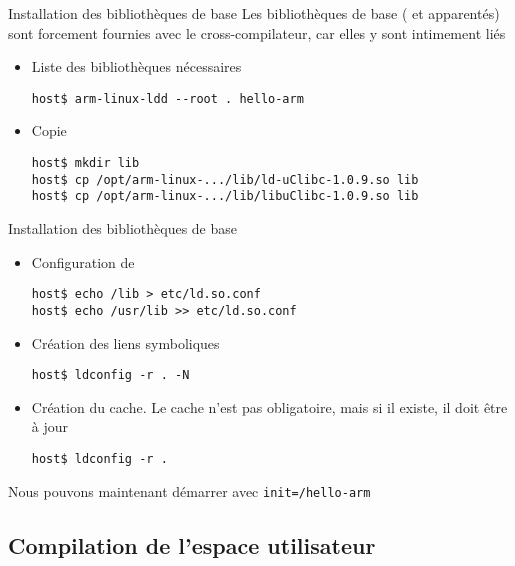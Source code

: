 \begin{frame}[fragile=singleslide]{Installation des bibliothèques de base}
  Les bibliothèques de base  ( et apparentés) sont forcement
  fournies avec le cross-compilateur, car elles y sont intimement liés
  \begin{itemize}
  \item Liste des bibliothèques nécessaires
    \begin{lstlisting}
host$ arm-linux-ldd --root . hello-arm
    \end{lstlisting}
    \item Copie
    \begin{lstlisting}
host$ mkdir lib
host$ cp /opt/arm-linux-.../lib/ld-uClibc-1.0.9.so lib
host$ cp /opt/arm-linux-.../lib/libuClibc-1.0.9.so lib
    \end{lstlisting}
  \end{itemize}
\end{frame}

\begin{frame}[fragile=singleslide]{Installation des bibliothèques de base}
  \begin{itemize}
  \item Configuration de 
    \begin{lstlisting}
host$ echo /lib > etc/ld.so.conf
host$ echo /usr/lib >> etc/ld.so.conf
    \end{lstlisting}
  \item Création des liens symboliques
    \begin{lstlisting}
host$ ldconfig -r . -N
    \end{lstlisting}
  \item Création du cache. Le  cache n'est pas obligatoire, mais si il
    existe, il doit être à jour
    \begin{lstlisting}
host$ ldconfig -r .
    \end{lstlisting}
  \end{itemize}
  Nous pouvons maintenant démarrer avec \verb+init=/hello-arm+
\end{frame}

\subsection{Compilation de l'espace utilisateur}

